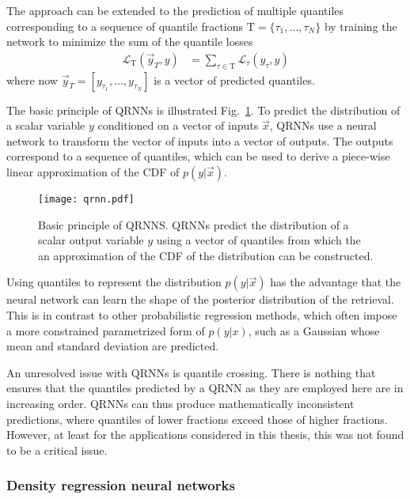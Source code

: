 The approach can be extended to the prediction of multiple quantiles
corresponding to a sequence of quantile fractions $\mathrm{T} = \{\tau_1,
\ldots, \tau_N\}$ by training the network to minimize the sum of the quantile
losses
\begin{align}
  \mathcal{L}_\mathrm{T}(\vec{y}_T, y) &= 
  \sum_{\tau \in \mathrm{T}} \mathcal{L}_\tau(y_\tau, y)
\end{align}
where now $\vec{y}_T = [y_{\tau_1}, \ldots, y_{\tau_N}]$ is a vector of predicted quantiles.

The basic principle of QRNNs is illustrated
Fig.~\ref{fig:machine_learning:qrnn}. To predict the distribution of a scalar
variable $y$ conditioned on a vector of inputs $\vec{x}$, QRNNs use a neural
network to transform the vector of inputs into a vector of outputs. The outputs
correspond to a sequence of quantiles, which can be used to derive a piece-wise
linear approximation of the CDF of $p(y|\vec{x})$.

\begin{figure}[btp]
  \centering
  \texttt{[image: qrnn.pdf]}
  \caption{Basic principle of QRNNS. QRNNs predict the distribution of
    a scalar output variable $y$ using a vector of quantiles from which the
    an approximation of the CDF of the distribution can be constructed.}
  \label{fig:machine_learning:qrnn}
\end{figure}

Using quantiles to represent the distribution $p(y|\vec{x})$ has the advantage
that the neural network can learn the shape of the posterior distribution of the
retrieval. This is in contrast to other probabilistic regression methods, which
often impose a more constrained parametrized form of $p(y|x)$, such as a Gaussian
whose mean and standard deviation are predicted.

An unresolved issue with QRNNs is quantile crossing. There is nothing that
ensures that the quantiles predicted by a QRNN as they are employed here are in
increasing order. QRNNs can thus produce mathematically inconsistent
predictions, where quantiles of lower fractions exceed those of higher
fractions. However, at least for the applications considered in this thesis,
this was not found to be a critical issue.

\subsubsection{Density regression neural networks}

